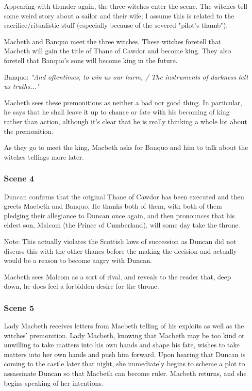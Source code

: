 Appearing with thunder again, the three witches enter the scene. The witches tell some weird story about a sailor and their wife; I assume this is related to the sacrifice/ritualistic stuff (especially because of the severed "pilot's thumb").

Macbeth and Banquo meet the three witches. These witches foretell that Macbeth
will gain the title of Thane of Cawdor and become king. They also foretell that
Banquo's sons will become king in the future.

Banquo: \textit{"And oftentimes, to win us our harm, / The instruments of darkness tell us truths..."}

Macbeth sees these premonitions as neither a bad nor good thing. In particular, he says that he shall leave it up to chance or fate with his becoming of king rather than action, although it's clear that he is really thinking a whole lot about the premonition.

As they go to meet the king, Macbeth asks for Banquo and him to talk about the witches tellings more later.

\subsubsection{Scene 4}

Duncan confirms that the original Thane of Cawdor has been executed and then
greets Macbeth and Banquo. He thanks both of them, with both of them pledging their allegiance to Duncan once again, and then pronounces that his
eldest son, Malcom (the Prince of Cumberland), will some day take the throne.

Note: This actually violates the Scottish laws of succession as Duncan did not
discuss this with the other thanes before the making the decision and actually
would be a reason to become angry with Duncan.

Macbeth sees Malcom as a sort of rival, and reveals to the reader that, deep
down, he does feel a forbidden desire for the throne.

\subsubsection{Scene 5}

Lady Macbeth receives letters from Macbeth telling of his exploits as well as
the witches' premonition. Lady Macbeth, knowing that Macbeth may be too kind or
unwilling to take matters into his own hands and shape his fate, wishes to take
matters into her own hands and push him forward. Upon hearing that Duncan is
coming to the castle later that night, she immediately begins to scheme a plot
to assassinate Duncan so that Macbeth can become ruler. Macbeth returns, and she begins speaking of her intentions.

